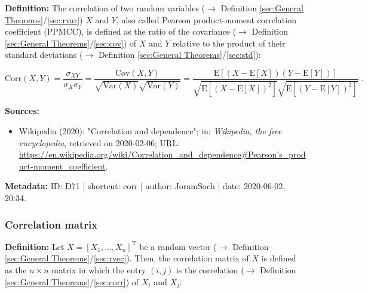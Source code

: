 \documentclass[a4paper,12pt,twoside]{book}
\begin{document}
\textbf{Definition:} The correlation of two random variables ($\rightarrow$ Definition \ref{sec:General Theorems}/\ref{sec:rvar}) $X$ and $Y$, also called Pearson product-moment correlation coefficient (PPMCC), is defined as the ratio of the covariance ($\rightarrow$ Definition \ref{sec:General Theorems}/\ref{sec:cov}) of $X$ and $Y$ relative to the product of their standard deviations ($\rightarrow$ Definition \ref{sec:General Theorems}/\ref{sec:std}):

\begin{equation} \label{eq:corr-corr}
\mathrm{Corr}(X,Y) = \frac{\sigma_{XY}}{\sigma_X \sigma_Y} = \frac{\mathrm{Cov}(X,Y)}{\sqrt{\mathrm{Var}(X)} \sqrt{\mathrm{Var}(Y)}} = \frac{\mathrm{E}\left[ (X-\mathrm{E}[X]) (Y-\mathrm{E}[Y]) \right]}{\sqrt{\mathrm{E}\left[ (X-\mathrm{E}[X])^2 \right]} \sqrt{\mathrm{E}\left[ (Y-\mathrm{E}[Y])^2 \right]}} \; .
\end{equation}


\vspace{1em}
\textbf{Sources:}
\begin{itemize}
\item Wikipedia (2020): "Correlation and dependence"; in: \textit{Wikipedia, the free encyclopedia}, retrieved on 2020-02-06; URL: \url{https://en.wikipedia.org/wiki/Correlation_and_dependence#Pearson's_product-moment_coefficient}.
\end{itemize}


\vspace{1em}
\textbf{Metadata:} ID: D71 | shortcut: corr | author: JoramSoch | date: 2020-06-02, 20:34.
\vspace{1em}



\subsubsection[\textit{Correlation matrix}]{Correlation matrix} \label{sec:corrmat}
\setcounter{equation}{0}

\textbf{Definition:} Let $X = [X_1, \ldots, X_n]^\mathrm{T}$ be a random vector ($\rightarrow$ Definition \ref{sec:General Theorems}/\ref{sec:rvec}). Then, the correlation matrix of $X$ is defined as the $n \times n$ matrix in which the entry $(i,j)$ is the correlation ($\rightarrow$ Definition \ref{sec:General Theorems}/\ref{sec:corr}) of $X_i$ and $X_j$:
\end{document}
